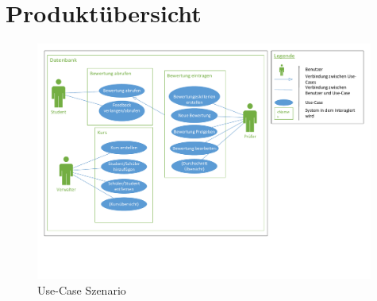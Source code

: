\documentclass[a4paper,listof=leveldown,listof=numbered]{scrreprt}
\begin{document}
\chapter{Produktübersicht}
	\begin{figure}[H]
		\centering
		\includegraphics[width=0.99\textwidth]{../Diagramme/Use_Case.pdf}
		\caption{Use-Case Szenario}
	\end{figure}
\end{document}
